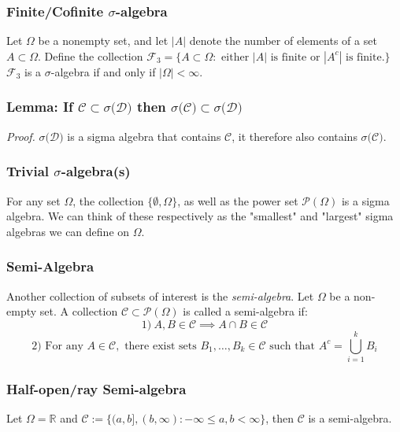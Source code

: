 \documentclass{article}
\begin{document}
\subsubsection{Finite/Cofinite $\sigma$-algebra}
Let $\Omega$ be a nonempty set, and let $|A|$ denote the number of elements of a set $A\subset \Omega$. Define the collection $\mathcal{F}_3=\{A \subset \Omega: \text{ either } |A| \text{ is finite or } |A^c| \text{ is finite.}\}$
$\mathcal{F}_3$ is a $\sigma$-algebra if and only if $|\Omega|<\infty$.

\subsubsection{Lemma: If $\mathcal{C}\subset\sigma(\mathcal{D)}$ then $\sigma(\mathcal{C)}\subset\sigma(\mathcal{D)}$}
\textit{Proof.} \newline \newline
$\sigma(\mathcal{D)}$ is a sigma algebra that contains $\mathcal{C}$, it therefore also contains $\sigma(\mathcal{C)}$.


\subsubsection{Trivial $\sigma$-algebra(s)}

For any set $\Omega$, the collection $\{\emptyset,\Omega\}$, as well as the power set $\mathcal{P}(\Omega)$ is a sigma algebra. We can think of these respectively as the "smallest" and "largest" sigma algebras we can define on $\Omega$.

\subsubsection{Semi-Algebra}
Another collection of subsets of interest is the \emph{semi-algebra}. Let $\Omega$ be a non-empty set. A collection $\mathcal{C} \subset \mathcal{P}(\Omega)$ is called a semi-algebra if: 
\[
1) \ A,B \in \mathcal{C} \implies A \cap B \in \mathcal{C}
\]
\[
2) \text{ For any } A \in \mathcal{C}, \text{ there exist sets } B_1,\ldots,B_k \in \mathcal{C} \text{ such that } A^c = \bigcup_{i=1}^k B_i
\]

\subsubsection{Half-open/ray Semi-algebra}
Let $\Omega = \mathbb{R}$ and $\mathcal{C}:=\{(a,b], (b, \infty): -\infty \leq a,b < \infty\}$, then $\mathcal{C}$ is a semi-algebra.
\end{document}
